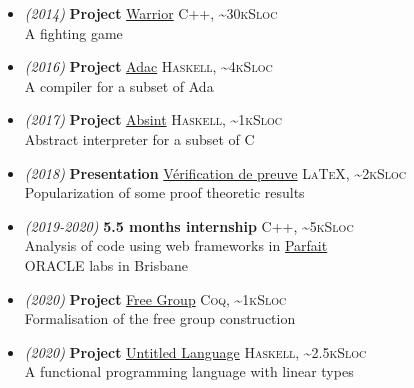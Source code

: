 \documentclass[a4paper,11pt]{extarticle}
\newcommand{\lang}[2]{\hfill \textsc{\scriptsize #1, \textasciitilde#2Sloc}}
\begin{document}
\begin{minipage}[c][282mm][t]{0.60\linewidth}
        \begin{itemize}
          \item \emph{\small (2014)} \textbf{Project} \href{https://github.com/DWARVES/Project-Warrior}{Warrior}
                \lang{C++}{30k}\\
                A fighting game
          \item \emph{\small (2016)} \textbf{Project} \href{https://github.com/TWal/ENS\_Adac}{Adac}
                \lang{Haskell}{4k}\\
                A compiler for a subset of Ada
          \item \emph{\small (2017)} \textbf{Project} \href{https://github.com/lucas8/absint}{Absint}
                \lang{Haskell}{1k}\\
                Abstract interpreter for a subset of C
          \item \emph{\small (2018)} \textbf{Presentation} \href{https://sapt.fr/exposes/verification-automatique-de-preuves-884}{Vérification de preuve}
                \lang{\LaTeX}{2k}\\
                Popularization of some proof theoretic results
          \item \emph{\small (2019-2020)} \textbf{5.5 months internship}
                \lang{C++}{5k}\\
                Analysis of code using web frameworks in \href{https://labs.oracle.com/pls/apex/f?p=LABS:project_details:0:13}{Parfait}\\
                ORACLE labs in Brisbane
          \item \emph{\small (2020)} \textbf{Project} \href{https://github.com/dwarfmaster/free_group_coq}{Free Group}
                \lang{Coq}{1k}\\
                Formalisation of the free group construction
          \item \emph{\small (2020)} \textbf{Project} \href{https://github.com/math-fehr/Untitled-Language}{Untitled Language}
                \lang{Haskell}{2.5k}\\
                A functional programming language with linear types
        \end{itemize}

    \end{minipage}
\end{document}
